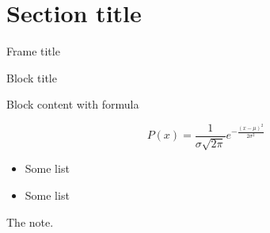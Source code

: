 \section{Section title}

	\begin{frame}{Frame title}
		
		\begin{fixblock}{Block title}
			
			Block content with formula
			
			\[
				P(x) = \frac{1}{{\sigma \sqrt{ 2 \pi } }} e^{ - \frac{(x - \mu)^2}{2 \sigma^2} }
			\]

		\end{fixblock}
		
		\begin{itemize}
			\item Some list
			\item Some list
		\end{itemize}

		\begin{fixnote}
			The note.
		\end{fixnote}
		
	\end{frame}

